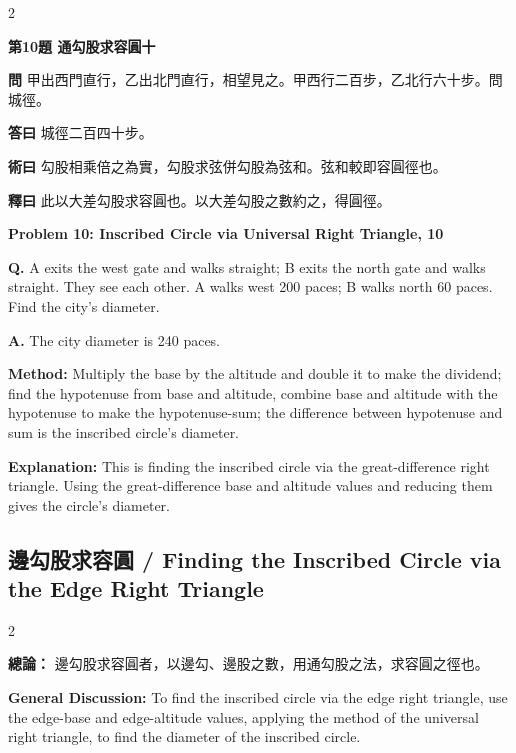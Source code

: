 \documentclass[11pt,a4paper]{article}
\newcommand{\wen}[1]{\noindent\textbf{問} #1\par\smallskip}
\newcommand{\da}[1]{\noindent\textbf{答曰} #1\par\smallskip}
\newcommand{\shu}[1]{\noindent\textbf{術曰} #1\par\smallskip}
\newcommand{\shi}[1]{\noindent\textbf{釋曰} #1\par\smallskip}
\newcommand{\wenE}[1]{\noindent\textbf{Q.} #1\par\smallskip}
\newcommand{\daE}[1]{\noindent\textbf{A.} #1\par\smallskip}
\newcommand{\shuE}[1]{\noindent\textbf{Method:} #1\par\smallskip}
\newcommand{\shiE}[1]{\noindent\textbf{Explanation:} #1\par\smallskip}
\begin{document}
\bigskip

\begin{paracol}{2}

\noindent\textbf{第10題 通勾股求容圓十}

\wen{甲出西門直行，乙出北門直行，相望見之。甲西行二百步，乙北行六十步。問城徑。}
\da{城徑二百四十步。}
\shu{勾股相乘倍之為實，勾股求弦併勾股為弦和。弦和較即容圓徑也。}
\shi{此以大差勾股求容圓也。以大差勾股之數約之，得圓徑。}

\switchcolumn

\noindent\textbf{Problem 10: Inscribed Circle via Universal Right Triangle, 10}

\wenE{A exits the west gate and walks straight; B exits the north gate and walks straight. They see each other. A walks west 200 paces; B walks north 60 paces. Find the city's diameter.}
\daE{The city diameter is 240 paces.}
\shuE{Multiply the base by the altitude and double it to make the dividend; find the hypotenuse from base and altitude, combine base and altitude with the hypotenuse to make the hypotenuse-sum; the difference between hypotenuse and sum is the inscribed circle's diameter.}
\shiE{This is finding the inscribed circle via the great-difference right triangle. Using the great-difference base and altitude values and reducing them gives the circle's diameter.}

\end{paracol}

\clearpage

\subsection*{邊勾股求容圓 / Finding the Inscribed Circle via the Edge Right Triangle}

\begin{paracol}{2}

\noindent\textbf{總論：} 邊勾股求容圓者，以邊勾、邊股之數，用通勾股之法，求容圓之徑也。

\switchcolumn

\noindent\textbf{General Discussion:} To find the inscribed circle via the edge right triangle, use the edge-base and edge-altitude values, applying the method of the universal right triangle, to find the diameter of the inscribed circle.

\end{paracol}
\end{document}
